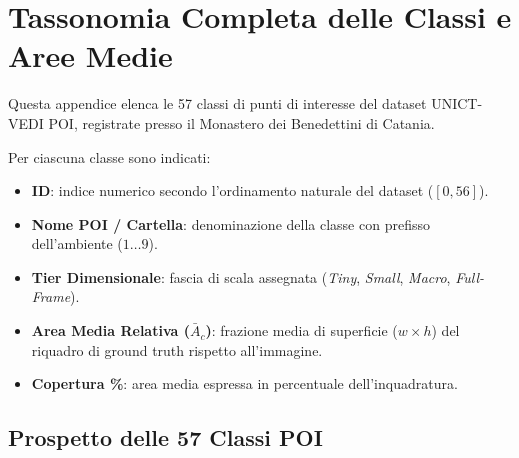 \chapter{Tassonomia Completa delle Classi e Aree Medie}
\label{chap:appendice_classi}

Questa appendice elenca le 57 classi di punti di interesse del dataset UNICT-VEDI POI, registrate presso il Monastero dei Benedettini di Catania.

Per ciascuna classe sono indicati:
\begin{itemize}
    \item \textbf{ID}: indice numerico secondo l'ordinamento naturale del dataset ($[0, 56]$).
    \item \textbf{Nome POI / Cartella}: denominazione della classe con prefisso dell'ambiente ($1 \dots 9$).
    \item \textbf{Tier Dimensionale}: fascia di scala assegnata (\textit{Tiny}, \textit{Small}, \textit{Macro}, \textit{Full-Frame}).
    \item \textbf{Area Media Relativa ($\bar{A}_c$)}: frazione media di superficie ($w \times h$) del riquadro di ground truth rispetto all'immagine.
    \item \textbf{Copertura \%}: area media espressa in percentuale dell'inquadratura.
\end{itemize}

\section{Prospetto delle 57 Classi POI}
\label{sec:app_tabella_57_classi}

